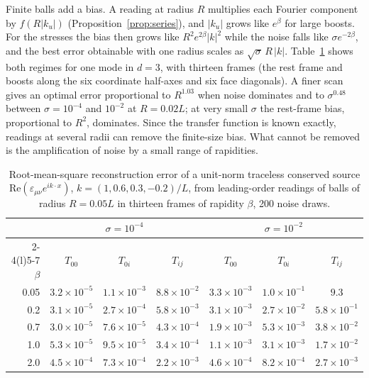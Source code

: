 \documentclass[12pt]{article}
\theoremstyle{definition}
\theoremstyle{remark}
\begin{document}
Finite balls add a bias. A reading at radius \(R\) multiplies each Fourier component by
\(f(R|k_u|)\) (Proposition~\ref{prop:series}), and \(|k_u|\) grows like \(e^\beta\) for
large boosts. For the stresses the bias then grows like \(R^2e^{2\beta}|k|^2\) while the
noise falls like \(\sigma e^{-2\beta}\), and the best error obtainable with one radius scales
as \(\sqrt\sigma\,R\,|k|\). Table~\ref{tab:stability} shows both regimes for one mode in
\(d=3\), with thirteen frames (the rest frame and boosts along the six coordinate
half-axes and six face diagonals). A finer scan gives an optimal error proportional to
\(R^{1.03}\) when noise dominates and to \(\sigma^{0.48}\) between \(\sigma=10^{-4}\) and
\(10^{-2}\) at \(R=0.02L\); at very small \(\sigma\) the rest-frame bias, proportional to
\(R^2\), dominates. Since the transfer function is known exactly, readings at
several radii can remove the finite-size bias. What cannot be removed is the amplification
of noise by a small range of rapidities.

\begin{table}[ht]
\centering
\small
\begin{tabular}{@{}rcccccc@{}}
\toprule
& \multicolumn{3}{c}{\(\sigma=10^{-4}\)} & \multicolumn{3}{c}{\(\sigma=10^{-2}\)}\\
\cmidrule(lr){2-4}\cmidrule(l){5-7}
\(\beta\) & \(T_{00}\) & \(T_{0i}\) & \(T_{ij}\) & \(T_{00}\) & \(T_{0i}\) & \(T_{ij}\)\\
\midrule
0.05 & \(3.2\times10^{-5}\) & \(1.1\times10^{-3}\) & \(8.8\times10^{-2}\) & \(3.3\times10^{-3}\) & \(1.0\times10^{-1}\) & \(9.3\)\\
0.2 & \(3.1\times10^{-5}\) & \(2.7\times10^{-4}\) & \(5.8\times10^{-3}\) & \(3.1\times10^{-3}\) & \(2.7\times10^{-2}\) & \(5.8\times10^{-1}\)\\
0.7 & \(3.0\times10^{-5}\) & \(7.6\times10^{-5}\) & \(4.3\times10^{-4}\) & \(1.9\times10^{-3}\) & \(5.3\times10^{-3}\) & \(3.8\times10^{-2}\)\\
1.0 & \(5.3\times10^{-5}\) & \(9.5\times10^{-5}\) & \(3.4\times10^{-4}\) & \(1.1\times10^{-3}\) & \(3.1\times10^{-3}\) & \(1.7\times10^{-2}\)\\
2.0 & \(4.5\times10^{-4}\) & \(7.3\times10^{-4}\) & \(2.2\times10^{-3}\) & \(4.6\times10^{-4}\) & \(8.2\times10^{-4}\) & \(2.7\times10^{-3}\)\\
\bottomrule
\end{tabular}
\caption{Root-mean-square reconstruction error of a unit-norm traceless conserved source
\(\mathrm{Re}(\varepsilon_{\mu\nu}e^{ik\cdot x})\), \(k=(1,0.6,0.3,-0.2)/L\), from leading-order
readings of balls of radius \(R=0.05L\) in thirteen frames of rapidity \(\beta\), 200 noise
draws.}
\label{tab:stability}
\end{table}
\end{document}
